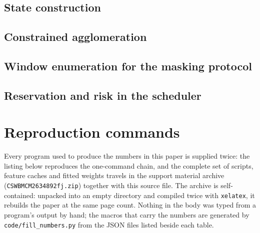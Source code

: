 \documentclass{swmcmthesis}
\begin{document}
\begin{appendices}
\subsection*{State construction}



\subsection*{Constrained agglomeration}



\subsection*{Window enumeration for the masking protocol}



\subsection*{Reservation and risk in the scheduler}



\section{Reproduction commands}
\label{app:repro}

Every program used to produce the numbers in this paper is supplied twice: the listing
below reproduces the one-command chain, and the complete set of scripts, feature caches and
fitted weights travels in the support material archive
(\texttt{CSWBMCM2634892fj.zip}) together with this source file. The archive is
self-contained: unpacked into an empty directory and compiled twice with \texttt{xelatex},
it rebuilds the paper at the same page count. Nothing in the body was typed from a
program's output by hand; the macros that carry the numbers are generated by
\texttt{code/fill\_numbers.py} from the JSON files listed beside each table.


\end{appendices}
\end{document}

